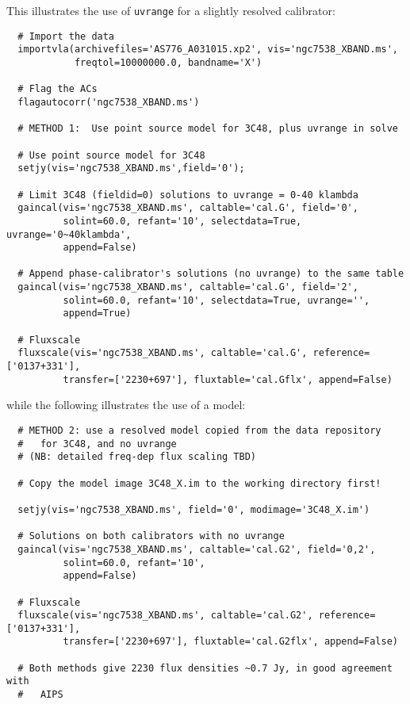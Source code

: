 This illustrates the use of {\tt uvrange} for a slightly resolved 
calibrator:
\small
\begin{verbatim}
  # Import the data
  importvla(archivefiles='AS776_A031015.xp2', vis='ngc7538_XBAND.ms',
            freqtol=10000000.0, bandname='X')

  # Flag the ACs
  flagautocorr('ngc7538_XBAND.ms')

  # METHOD 1:  Use point source model for 3C48, plus uvrange in solve

  # Use point source model for 3C48
  setjy(vis='ngc7538_XBAND.ms',field='0');

  # Limit 3C48 (fieldid=0) solutions to uvrange = 0-40 klambda
  gaincal(vis='ngc7538_XBAND.ms', caltable='cal.G', field='0',
          solint=60.0, refant='10', selectdata=True, uvrange='0~40klambda', 
          append=False)

  # Append phase-calibrator's solutions (no uvrange) to the same table
  gaincal(vis='ngc7538_XBAND.ms', caltable='cal.G', field='2', 
          solint=60.0, refant='10', selectdata=True, uvrange='', 
          append=True)

  # Fluxscale
  fluxscale(vis='ngc7538_XBAND.ms', caltable='cal.G', reference=['0137+331'],
          transfer=['2230+697'], fluxtable='cal.Gflx', append=False)
\end{verbatim}
\normalsize
while the following illustrates the use of a model:
\small
\begin{verbatim}
  # METHOD 2: use a resolved model copied from the data repository
  #   for 3C48, and no uvrange
  # (NB: detailed freq-dep flux scaling TBD)

  # Copy the model image 3C48_X.im to the working directory first!

  setjy(vis='ngc7538_XBAND.ms', field='0', modimage='3C48_X.im')

  # Solutions on both calibrators with no uvrange
  gaincal(vis='ngc7538_XBAND.ms', caltable='cal.G2', field='0,2',
          solint=60.0, refant='10', 
          append=False)

  # Fluxscale
  fluxscale(vis='ngc7538_XBAND.ms', caltable='cal.G2', reference=['0137+331'],
          transfer=['2230+697'], fluxtable='cal.G2flx', append=False)

  # Both methods give 2230 flux densities ~0.7 Jy, in good agreement with
  #   AIPS
\end{verbatim}
\normalsize



